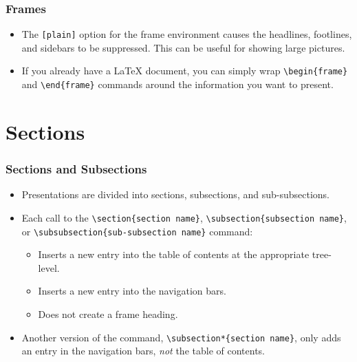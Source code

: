 \documentclass[aspectratio=169,utf8]{ctexbeamer}
\begin{document}
\begin{frame}[fragile]
  \frametitle{Frames}

  \begin{itemize}
    \setlength{\itemsep}{8pt}
    \item The {\tt [plain]} option for the frame environment causes the headlines, footlines, and sidebars to be suppressed. This can be useful for showing large pictures.
    \item If you already have a \LaTeX{} document, you can simply wrap {\tt \verb|\begin{frame}|} and {\tt \verb|\end{frame}|} commands around the information you want to present.
  \end{itemize}
\end{frame}

\section{Sections}

\begin{frame}[fragile]
  \frametitle{Sections and Subsections}

  \begin{itemize}
    \setlength{\itemsep}{8pt}
    \item Presentations are divided into sections, subsections, and sub-subsections.
    \item Each call to the {\tt \verb|\section{section name}|}, {\tt \verb|\subsection{subsection name}|}, or {\tt \verb|\subsubsection{sub-subsection name}|} command:
      \begin{itemize}
        \item Inserts a new entry into the table of contents at the appropriate tree-level.
        \item Inserts a new entry into the navigation bars.
        \item Does not create a frame heading.
      \end{itemize}
    \item Another version of the command, {\tt \verb|\subsection*{section name}|}, only adds an entry in the navigation bars, \textit{not} the table of contents.
  \end{itemize}

\end{frame}
\end{document}
